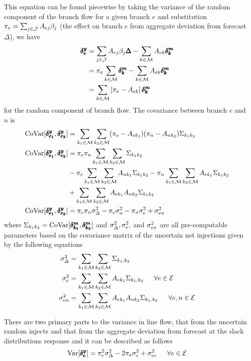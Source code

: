 This equation can be found piecewise by taking the variance of the random component of the branch flow for a given branch $e$ and substitution $\pi_e = \sum_{j \in \mathcal{J}} A_{ej} \beta_j$ (the effect on branch $e$ from aggregate deviation from forecast $\Delta$), we have
\begin{align*}
  \pmb{\delta^y_e} &= \sum_{j \in \mathcal{J}} A_{ej} \beta_j \pmb{\Delta} - \sum_{k \in \mathcal{M}} A_{ek} \pmb{\delta^m_k}\\
&= \pi_e \sum_{k \in \mathcal{M}} \pmb{\delta^m_k} - \sum_{k \in \mathcal{M}} A_{ek} \pmb{\delta^m_k}\\
&= \sum_{k \in \mathcal{M}} \left[ \pi_e  - A_{ek} \right] \pmb{\delta^m_k} 
\end{align*}
for the random component of branch flow. The covariance between branch $e$ and $n$ is
\begin{subequations}\label{covar_branch}
\begin{align}
\operatorname{CoVar}[ \pmb{\delta^y_{e_1}},\pmb{\delta^y_{e_2}} ] &=  \sum_{k_1 \in \mathcal{M}} \sum_{k_2 \in \mathcal{M}} (\pi_{e} - A_{e k_1}) (\pi_{n} - A_{n k_2}) \Sigma_{k_1 k_2} \\
\operatorname{CoVar}[ \pmb{\delta^y_{e_1}},\pmb{\delta^y_{e_2}} ] &=  \pi_{e} \pi_{n} \sum_{k_1 \in \mathcal{M}} \sum_{k_2 \in \mathcal{M}} \Sigma_{k_1 k_2} \\
& -  \pi_{e} \sum_{k_1 \in \mathcal{M}} \sum_{k_2 \in \mathcal{M}} A_{n k_1} \Sigma_{k_1 k_2} - \pi_{n} \sum_{k_1 \in \mathcal{M}} \sum_{k_2 \in \mathcal{M}} A_{e k_1} \Sigma_{k_1 k_2}   \\
&+ \sum_{k_1 \in \mathcal{M}} \sum_{k_2 \in \mathcal{M}} A_{e k_1} A_{n k_2} \Sigma_{k_1 k_2}  \\
\operatorname{CoVar}[ \pmb{\delta^y_{e_1}},\pmb{\delta^y_{e_2}} ] &=  \pi_{e} \pi_{n} \sigma_\Delta^2 -  \pi_{e} \sigma_{n}^2 - \pi_{n} \sigma_{e}^2   + \sigma_{e n}^2
\end{align}
\end{subequations}
where $\Sigma_{k_1 k_2} = \operatorname{CoVar}[ \pmb{\delta^m_{k_1}} ,\pmb{\delta^m_{k_2}} ]$ and  $\sigma_\Delta^2, \sigma_e^2,$ and $\sigma_{en}^2$ are all pre-computable parameters based on the covariance matrix of the uncertain net injections given by the following equations
\begin{subequations}
\begin{align}
 \sD &= \sko \skt \sigot  \\
 \se &= \sko \skt A_{ek_1} \sigot   \hspace{15px} \forall e \in \cE\\
 \seealone &= \sko \skt A_{e k_1} A_{n k_2} \sigot \hspace{15px} \forall e,n \in \cE
\end{align}
\end{subequations}


There are two primary parts to the variance in line flow, that from the uncertain random injects and that from the aggregate deviation from forecast at the slack distributions response and it can be described as follows  
\begin{equation}
\operatorname{Var}[ \rdfe ] =  \pi_e^2  \sD  - 2 \pi_e \se  + \see  \hspace{15px} \forall e \in \cE
\end{equation}



